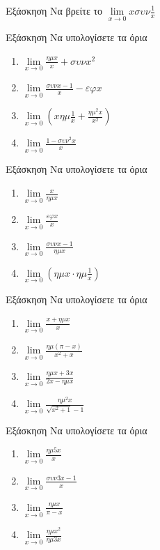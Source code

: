 \documentclass[greek]{beamer}
\begin{document}
\begin{frame}{Εξάσκηση}
 Να βρείτε το $\lim\limits_{x \to 0}{ xσυν\frac{1}{x} }$
\end{frame}

\begin{frame}{Εξάσκηση}
 Να υπολογίσετε τα όρια
 \begin{enumerate}
  \item $\lim\limits_{x \to 0}{ \frac{ημx}{x}+συνx^2 }$ \pause
  \item $\lim\limits_{x \to 0}{ \frac{συνx-1}{x}-εφx }$ \pause
  \item $\lim\limits_{x \to 0}{ \left( xημ\frac{1}{x}+\frac{ημ^2x}{x^2} \right)}$ \pause
  \item $\lim\limits_{x \to 0}{ \frac{1-συν^2x}{x} }$
 \end{enumerate}
\end{frame}

\begin{frame}{Εξάσκηση}
 Να υπολογίσετε τα όρια
 \begin{enumerate}
  \item $\lim\limits_{x \to 0}{ \frac{x}{ημx} }$ \pause
  \item $\lim\limits_{x \to 0}{ \frac{εφx}{x} }$ \pause
  \item $\lim\limits_{x \to 0}{ \frac{συνx-1}{ημx} }$ \pause
  \item $\lim\limits_{x \to 0}{ \left( ημx\cdot ημ\frac{1}{x} \right) }$
 \end{enumerate}
\end{frame}

\begin{frame}{Εξάσκηση}
 Να υπολογίσετε τα όρια
 \begin{enumerate}
  \item $\lim\limits_{x \to 0}{ \frac{x+ημx}{x} }$ \pause
  \item $\lim\limits_{x \to 0}{ \frac{ημ(π-x)}{x^2+x} }$ \pause
  \item $\lim\limits_{x \to 0}{ \frac{ημx+3x}{2x-ημx} }$ \pause
  \item $\lim\limits_{x \to 0}{ \frac{ημ^2x}{\sqrt{x^2+1}-1} }$
 \end{enumerate}
\end{frame}

\begin{frame}{Εξάσκηση}
 Να υπολογίσετε τα όρια
 \begin{enumerate}
  \item $\lim\limits_{x \to 0}{ \frac{ημ5x}{x} }$ \pause
  \item $\lim\limits_{x \to 0}{ \frac{συν3x-1}{x} }$ \pause
  \item $\lim\limits_{x \to 0}{ \frac{ημx}{π-x} }$ \pause
  \item $\lim\limits_{x \to 0}{ \frac{ημx^2}{ημ3x} }$
 \end{enumerate}
\end{frame}
\end{document}
